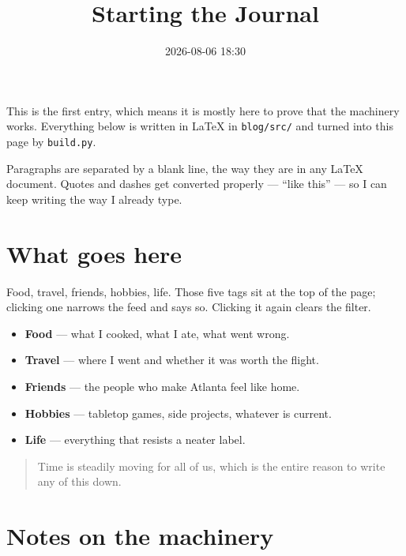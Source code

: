
\title{Starting the Journal}
\date{2026-08-06 18:30}



This is the first entry, which means it is mostly here to prove that the
machinery works. Everything below is written in LaTeX in
\texttt{blog/src/} and turned into this page by \texttt{build.py}.

Paragraphs are separated by a blank line, the way they are in any \LaTeX{}
document. Quotes and dashes get converted properly --- ``like this'' --- so I
can keep writing the way I already type.

\section{What goes here}

Food, travel, friends, hobbies, life. Those five tags sit at the top of the
page; clicking one narrows the feed and says so. Clicking it again clears the
filter.

\begin{itemize}
  \item \textbf{Food} --- what I cooked, what I ate, what went wrong.
  \item \textbf{Travel} --- where I went and whether it was worth the flight.
  \item \textbf{Friends} --- the people who make Atlanta feel like home.
  \item \textbf{Hobbies} --- tabletop games, side projects, whatever is current.
  \item \textbf{Life} --- everything that resists a neater label.
\end{itemize}

\begin{quote}
Time is steadily moving for all of us, which is the entire reason to write any
of this down.
\end{quote}

\section{Notes on the machinery}

